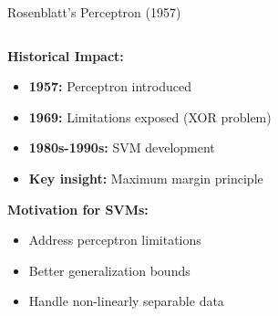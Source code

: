 \documentclass[8pt,aspectratio=1610]{beamer}
\begin{document}
\begin{frame}{Rosenblatt's Perceptron (1957)}
\begin{columns}[t]
\begin{column}{0.48\textwidth}
\textbf{Historical Impact:}
\vspace{0.2cm}

\begin{itemize}
\setlength{\itemsep}{2pt}
\item \textbf{1957:} Perceptron introduced
\item \textbf{1969:} Limitations exposed (XOR problem)
\item \textbf{1980s-1990s:} SVM development
\item \textbf{Key insight:} Maximum margin principle
\end{itemize}

\vspace{0.3cm}
\textbf{Motivation for SVMs:}
\begin{itemize}
\setlength{\itemsep}{1pt}
\item Address perceptron limitations
\item Better generalization bounds
\item Handle non-linearly separable data
\end{itemize}
\end{column}
\end{columns}
\end{frame}
\end{document}
